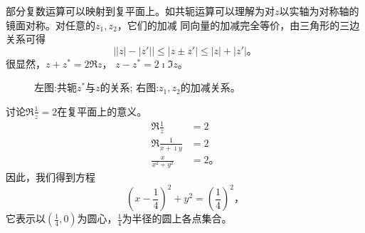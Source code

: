 部分复数运算可以映射到复平面上。如共轭运算可以理解为对$z$以实轴为对称轴的镜面对称。对任意的$z_1,z_2$，它们的加减
同向量的加减完全等价，由三角形的三边关系可得
\begin{equation}
    \left| |z|- |z'| \right| \leq |z \pm z'| \leq |z| + |z'| \textrm{。}
\end{equation}
很显然，$z+z^{*} = 2 \Re z$， $z-z^{*} = 2\imath \Im z$。
\begin{figure}
    \centering
    
\quad 
        
        \caption{左图:共轭$z^{*}$与$z$的关系; 右图:$z_1, z_2$的加减关系。}
    \end{figure}
\begin{examplebox}{讨论$\Re \frac{1}{z} = 2$在复平面上的意义。}
    \begin{align*}
        \Re \frac{1}{z} &= 2\\
        \Re \frac{1}{x+\imath y} &  = 2 \\
        \frac{x}{x^2 +y^2} & = 2 \textrm{。}
    \end{align*}
因此，我们得到方程
\begin{equation*}
    (x-\frac{1}{4})^2 + y^2 = \left( \frac{1}{4}\right)^2\textrm{，}
\end{equation*}
它表示以$(\frac{1}{4},0)$为圆心，$\frac{1}{4}$为半径的圆上各点集合。
\end{examplebox}
        


